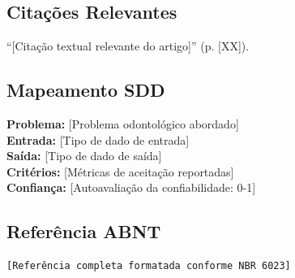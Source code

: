 \subsection{Citações Relevantes}
\begin{citacao}
``[Citação textual relevante do artigo]'' (p. [XX]).
\end{citacao}

\subsection{Mapeamento SDD}
\textbf{Problema:} [Problema odontológico abordado] \\
\textbf{Entrada:} [Tipo de dado de entrada] \\
\textbf{Saída:} [Tipo de dado de saída] \\
\textbf{Critérios:} [Métricas de aceitação reportadas] \\
\textbf{Confiança:} [Autoavaliação da confiabilidade: 0-1]

\subsection{Referência ABNT}
\begin{verbatim}
[Referência completa formatada conforme NBR 6023]
\end{verbatim}

